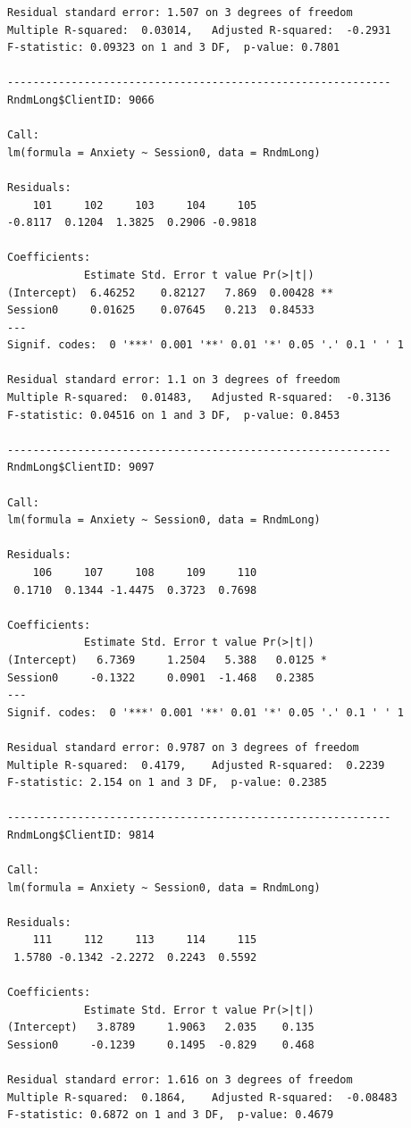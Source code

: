 \documentclass[
  11pt,
]{book}
\begin{document}
\begin{verbatim}
Residual standard error: 1.507 on 3 degrees of freedom
Multiple R-squared:  0.03014,   Adjusted R-squared:  -0.2931 
F-statistic: 0.09323 on 1 and 3 DF,  p-value: 0.7801

------------------------------------------------------------ 
RndmLong$ClientID: 9066

Call:
lm(formula = Anxiety ~ Session0, data = RndmLong)

Residuals:
    101     102     103     104     105 
-0.8117  0.1204  1.3825  0.2906 -0.9818 

Coefficients:
            Estimate Std. Error t value Pr(>|t|)   
(Intercept)  6.46252    0.82127   7.869  0.00428 **
Session0     0.01625    0.07645   0.213  0.84533   
---
Signif. codes:  0 '***' 0.001 '**' 0.01 '*' 0.05 '.' 0.1 ' ' 1

Residual standard error: 1.1 on 3 degrees of freedom
Multiple R-squared:  0.01483,   Adjusted R-squared:  -0.3136 
F-statistic: 0.04516 on 1 and 3 DF,  p-value: 0.8453

------------------------------------------------------------ 
RndmLong$ClientID: 9097

Call:
lm(formula = Anxiety ~ Session0, data = RndmLong)

Residuals:
    106     107     108     109     110 
 0.1710  0.1344 -1.4475  0.3723  0.7698 

Coefficients:
            Estimate Std. Error t value Pr(>|t|)  
(Intercept)   6.7369     1.2504   5.388   0.0125 *
Session0     -0.1322     0.0901  -1.468   0.2385  
---
Signif. codes:  0 '***' 0.001 '**' 0.01 '*' 0.05 '.' 0.1 ' ' 1

Residual standard error: 0.9787 on 3 degrees of freedom
Multiple R-squared:  0.4179,    Adjusted R-squared:  0.2239 
F-statistic: 2.154 on 1 and 3 DF,  p-value: 0.2385

------------------------------------------------------------ 
RndmLong$ClientID: 9814

Call:
lm(formula = Anxiety ~ Session0, data = RndmLong)

Residuals:
    111     112     113     114     115 
 1.5780 -0.1342 -2.2272  0.2243  0.5592 

Coefficients:
            Estimate Std. Error t value Pr(>|t|)
(Intercept)   3.8789     1.9063   2.035    0.135
Session0     -0.1239     0.1495  -0.829    0.468

Residual standard error: 1.616 on 3 degrees of freedom
Multiple R-squared:  0.1864,    Adjusted R-squared:  -0.08483 
F-statistic: 0.6872 on 1 and 3 DF,  p-value: 0.4679


\end{verbatim}
\end{document}
